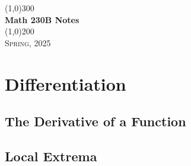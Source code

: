 \documentclass[a4paper, openany]{book}
\begin{document}
\begin{titlepage}
    \begin{center}
        \line(1,0){300} \\
        [0.25in]
        \huge{\bfseries Math 230B Notes} \\
        [2mm]
        \line(1,0){200} \\
        [1.5cm]
        \textsc{\LARGE Spring, 2025}
    \end{center}
\end{titlepage}

\tableofcontents
\setcounter{section}{0}

\chapter{Differentiation}

\section{The Derivative of a Function}

\newpage

\section{Local Extrema}

\newpage
\end{document}
